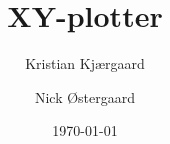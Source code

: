 \documentclass[report,showkeys]{../mypaper}
\title{XY-plotter}
\author{Kristian Kjærgaard \and Nick Østergaard}
\date{\today}
\begin{document}
\maketitle

\lipsum
\end{document}
